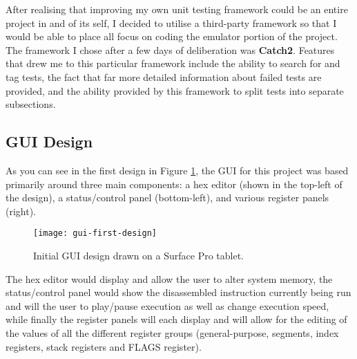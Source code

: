 	After realising that improving my own unit testing framework could be an entire project in and of its self, I decided to utilise a third-party framework so that I would be able to place all focus on coding the emulator portion of the project. The framework I chose after a few days of deliberation was \textbf{Catch2}. Features that drew me to this particular framework include the ability to search for and tag tests, the fact that far more detailed information about failed tests are provided, and the ability provided by this framework to split tests into separate subsections.

\subsection{GUI Design}
	As you can see in the first design in Figure \ref{figure:gui-first-design}, the GUI for this project was based primarily around three main components: a hex editor (shown in the top-left of the design), a status/control panel (bottom-left), and various register panels (right).

	\begin{figure}
		\centering
		\texttt{[image: gui-first-design]}
		\caption{Initial GUI design drawn on a Surface Pro tablet.}
		\label{figure:gui-first-design}
	\end{figure}

	The hex editor would display and allow the user to alter system memory, the status/control panel would show the disassembled instruction currently being run and will the user to play/pause execution as well as change execution speed, while finally the register panels will each display and will allow for the editing of the values of all the different register groups (general-purpose, segments, index registers, stack registers and FLAGS register).